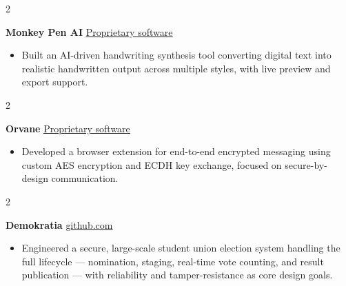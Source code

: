 \documentclass[10pt, a4paper]{article}
\newenvironment{highlights}{
    \begin{itemize}[
        topsep=0.10 cm,
        parsep=0.10 cm,
        partopsep=0pt,
        itemsep=0pt,
        leftmargin=0 cm + 10pt
    ]
}{
    \end{itemize}
} %
\newenvironment{twocolentry}[2][]{
    \onecolentry
    \def\secondColumn{#2}
    \setcolumnwidth{\fill, 4.5 cm}
    \begin{paracol}{2}
}{
    \switchcolumn \raggedleft \secondColumn
    \end{paracol}
    \endonecolentry
} %
\begin{document}
        \vspace{0.01 cm}

        \begin{twocolentry}{
            \href{https://github.com/TimsTittus/}{\underline{Proprietary software}}
        }
            \textbf{Monkey Pen AI}\end{twocolentry}

        \vspace{0.01 cm}

            \begin{highlights}
                \item Built an AI-driven handwriting synthesis tool converting digital text into realistic handwritten output across multiple styles, with live preview and export support.
            \end{highlights}

        \vspace{0.01 cm}

         \begin{twocolentry}{
            \href{https://github.com/TimsTittus/Orvane}{\underline{Proprietary software}}
        }
            \textbf{Orvane}\end{twocolentry}

        \vspace{0.01 cm}

            \begin{highlights}
                \item Developed a browser extension for end-to-end encrypted messaging using custom AES encryption and ECDH key exchange, focused on secure-by-design communication.
            \end{highlights}

        \vspace{0.01 cm}

            \begin{twocolentry}{
            \href{https://github.com/TimsTittus/Demokratia}{\underline{github.com}}
        }
            \textbf{Demokratia}\end{twocolentry}

        \vspace{0.01 cm}

            \begin{highlights}
                \item Engineered a secure, large-scale student union election system handling the full lifecycle — nomination, staging, real-time vote counting, and result publication — with reliability and tamper-resistance as core design goals.
            \end{highlights}
\end{document}
